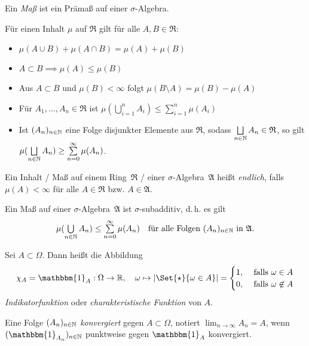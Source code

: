 \documentclass{cheat-sheet}
\newcommand{\Alg}{\mathfrak{A}} %
\newcommand{\Ring}{\mathfrak{R}} %
\newcommand{\ind}{\mathbbm{1}} %
\begin{document}
\begin{defn}
  Ein \emph{Maß} ist ein Prämaß auf einer $\sigma$-Algebra.
\end{defn}

\begin{satz}
  Für einen Inhalt $\mu$ auf $\Ring$ gilt für alle $A, B \in \Ring$:
  \begin{itemize}
    \item $\mu(A \cup B) + \mu(A \cap B) = \mu(A) + \mu(B)$
    \item $A \subset B \implies \mu(A) \leq \mu(B)$ 
    \item Aus $A \subset B$ und $\mu(B) < \infty$ folgt $\mu(B \setminus A) = \mu(B) - \mu(A)$
    \item Für $A_1, ..., A_n \in \Ring$ ist $\mu\left(\bigcup_{i = 1}^n A_i \right) \leq \sum_{i = 1}^n \mu(A_i)$ 
    \item Ist $(A_n)_{n \in \mathbb{N}}$ eine Folge disjunkter Elemente aus $\Ring$, sodass $\bigsqcup_{n \in \N} A_n \in \Ring$, so gilt $\mu(\bigsqcup_{n \in \N} A_n) \geq \sum_{n=0}^\infty \mu(A_n)$.
  \end{itemize}
\end{satz}

\begin{defn}
  Ein Inhalt / Maß auf einem Ring~$\Ring$ / einer $\sigma$-Algebra~$\Alg$ heißt \emph{endlich}, falls $\mu(A) < \infty$ für alle $A \in \Ring$ bzw. $A \in \Alg$.
\end{defn}

\begin{satz}
  Ein Maß auf einer $\sigma$-Algebra~$\Alg$ ist $\sigma$-subadditiv, d.\,h. es gilt
  \[ \mu(\bigcup_{n \in \N} A_n) \leq \sum_{n=0}^\infty \mu(A_n) \quad \text{für alle Folgen $(A_n)_{n \in \N}$ in $\Alg$}. \]
\end{satz}

\begin{defn}
  Sei $A \subset \Omega$. Dann heißt die Abbildung
  \[ \chi_A = \ind_A : \Omega \to \R, \quad \omega \mapsto \abs{\Set{ \star }{ \omega \in A }} = \begin{cases} 1, & \text{ falls } \omega \in A \\ 0, & \text{ falls } \omega \not\in A \end{cases} \]
  \emph{Indikatorfunktion} oder \emph{charakteristische Funktion} von $A$.
\end{defn}

\begin{defn}
  Eine Folge $(A_n)_{n \in \mathbb{N}}$ \emph{konvergiert} gegen $A \subset \Omega$, notiert $\lim_{n \to \infty} A_n = A$, wenn $(\ind_{A_n})_{n \in \N}$ punktweise gegen $\ind_A$ konvergiert.
\end{defn}
\end{document}
